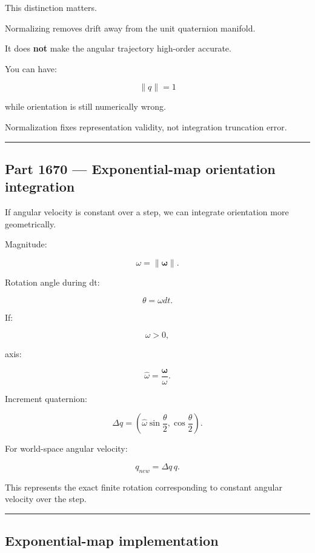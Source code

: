 This distinction matters.

Normalizing removes drift away from the unit quaternion manifold.

It does \textbf{not} make the angular trajectory high-order accurate.

You can have:

\[
\|q\|=1
\]

while orientation is still numerically wrong.

Normalization fixes representation validity, not integration truncation error.

\begin{center}\rule{0.5\linewidth}{0.5pt}\end{center}

\subsection{Part 1670 --- Exponential-map orientation integration}\label{06-engine-ii-ch037-part-1670-exponential-map-orientation-integration}

If angular velocity is constant over a step, we can integrate orientation more geometrically.

Magnitude:

\[
\omega=
\|\boldsymbol\omega\|.
\]

Rotation angle during dt:

\[
\theta
=
\omega dt.
\]

If:

\[
\omega>0,
\]

axis:

\[
\hat\omega
=
\frac{\boldsymbol\omega}{\omega}.
\]

Increment quaternion:

\[
\boxed{
\Delta q
=
\left(
\hat\omega
\sin\frac{\theta}{2},
\cos\frac{\theta}{2}
\right).
}
\]

For world-space angular velocity:

\[
\boxed{
q_{new}
=
\Delta q\,q.
}
\]

This represents the exact finite rotation corresponding to constant angular velocity over the step.

\begin{center}\rule{0.5\linewidth}{0.5pt}\end{center}

\subsection{Exponential-map implementation}\label{06-engine-ii-ch037-exponential-map-implementation}

